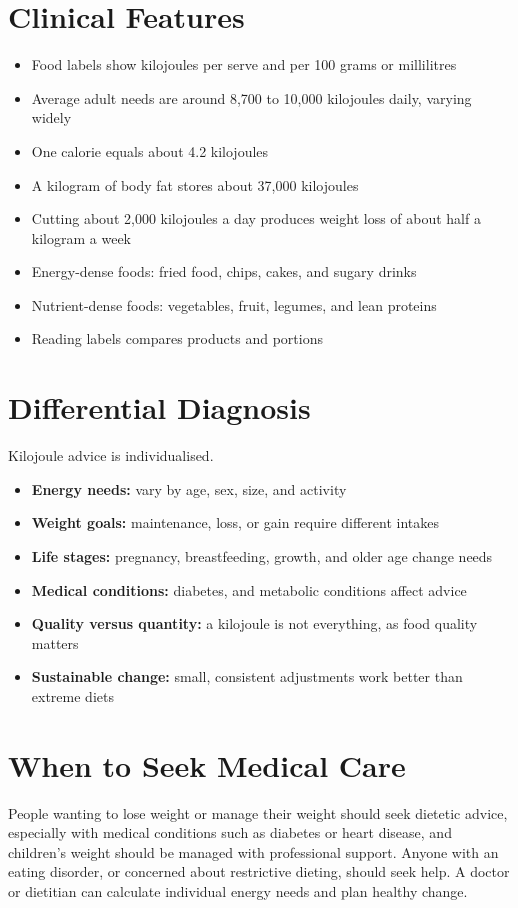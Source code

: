 \section*{Clinical Features}
\begin{itemize}
    \item Food labels show kilojoules per serve and per 100 grams or millilitres
    \item Average adult needs are around 8,700 to 10,000 kilojoules daily, varying widely
    \item One calorie equals about 4.2 kilojoules
    \item A kilogram of body fat stores about 37,000 kilojoules
    \item Cutting about 2,000 kilojoules a day produces weight loss of about half a kilogram a week
    \item Energy-dense foods: fried food, chips, cakes, and sugary drinks
    \item Nutrient-dense foods: vegetables, fruit, legumes, and lean proteins
    \item Reading labels compares products and portions
\end{itemize}

\section*{Differential Diagnosis}
Kilojoule advice is individualised.
\begin{itemize}
    \item \textbf{Energy needs:} vary by age, sex, size, and activity
    \item \textbf{Weight goals:} maintenance, loss, or gain require different intakes
    \item \textbf{Life stages:} pregnancy, breastfeeding, growth, and older age change needs
    \item \textbf{Medical conditions:} diabetes, and metabolic conditions affect advice
    \item \textbf{Quality versus quantity:} a kilojoule is not everything, as food quality matters
    \item \textbf{Sustainable change:} small, consistent adjustments work better than extreme diets
\end{itemize}

\section*{When to Seek Medical Care}
People wanting to lose weight or manage their weight should seek dietetic advice, especially with medical conditions such as diabetes or heart disease, and children's weight should be managed with professional support. Anyone with an eating disorder, or concerned about restrictive dieting, should seek help. A doctor or dietitian can calculate individual energy needs and plan healthy change.

